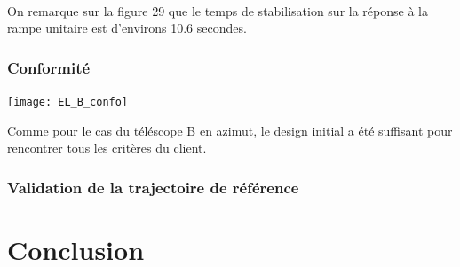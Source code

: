 \documentclass{udes_rapport} %
\begin{document}
\noindent\begin{minipage}{\textwidth}
\begin{minipage}{0.5\textwidth}
\end{minipage} 
\begin{minipage}{0.5\textwidth}
\end{minipage}%

\end{minipage}
\\
On remarque sur la figure 29 que le temps de stabilisation sur la réponse à la rampe unitaire  est d'environs 10.6 secondes. 
\subsubsection{Conformité}
\begin{center}
  \label{tab:conformite_B_EL}
  \texttt{[image: EL\_B\_confo]}
\end{center}
Comme pour le cas du téléscope B en azimut, le design initial a été suffisant pour rencontrer tous les critères du client.
\subsubsection{Validation de la trajectoire de référence}




\section{Conclusion}
\end{document}
